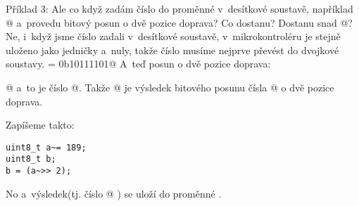 Příklad 3: Ale co když zadám číslo do proměnné v~desítkové soustavě, například @ a~provedu bitový posun o dvě pozice doprava? 
Co dostanu? Dostanu snad @? Ne, i~když jsme číslo zadali v~desítkové soustavě, v~mikrokontroléru je 
stejně uloženo jako jedničky a~nuly, takže číslo musíme nejprve převést do dvojkové soustavy.
 = 0b10111101@
A~teď posun o dvě pozice doprava:

@ a~to je číslo @.
Takže @ je výsledek bitového posunu čísla @ o dvě pozice doprava.

Zapíšeme takto:
\begin{verbatim}
uint8_t a~= 189;
uint8_t b;
b = (a~>> 2);
\end{verbatim}
No a~výsledek(tj. číslo @ ) se uloží do proměnné \verb@b@.

